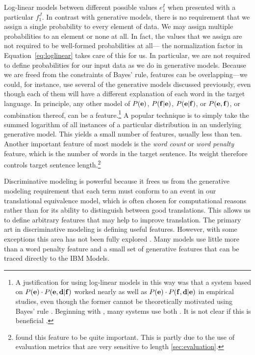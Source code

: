 \noindent Log-linear models 
between different possible values $e_1^I$ when presented
with a particular $f_1^J$.  In contrast
with generative models, there is no requirement that we
assign a single probability to every element of data.  
We may assign multiple probabilities to an element or none
at all.  In fact, the values that we assign are not
required to be well-formed probabilities at all---
the normalization factor in Equation~\ref{eq:loglinear}
takes care of this for us.
In particular, we are not required to define
probabilities for our input data as we do in 
generative models.  Because we are 
freed from the constraints of Bayes' rule, features 
can be overlapping---we could, for instance, use 
several of the generative models discussed previously,
even though each of them will have a different 
explanation of each word in the target language.
In principle, any other model of
$P({\bf e})$, $P({\bf f}|{\bf e})$, $P({\bf e}|{\bf f})$, or $P({\bf e},{\bf f})$, or combination
thereof, can be a feature.\footnote{A 
justification for using log-linear models in this way was that  
a system based on $P({\bf e}) \cdot P({\bf e},{\bf d}|{\bf f})$ worked nearly as well as 
$P({\bf e}) \cdot P({\bf f},{\bf d}|{\bf e})$ in empirical studies, even though the former
cannot be theoretically motivated using Bayes' rule
\citep{Och:1999:emnlp,Och:2002:acl}.  Beginning with \citep{Koehn:2004:amta},
many systems use both \citep{Simard:2005:hlt-emnlp,Marcu:2006:emnlp,Chiang:2007:cl}.
It is not clear if this is beneficial \citep{Lopez:2006:amta}.}  A 
popular technique is to simply take the summed logarithm of
all instances of a particular distribution in an underlying 
generative model.  This yields a small number of features,
usually less than ten.  Another important feature of
most models is the {\em word count} or {\em word penalty}
feature, which is the number of words in the
target sentence.  Its weight therefore controls
target sentence length.\footnote{\citet{Lopez:2006:amta} found this
feature to be quite important.  This is partly due to the use
of evaluation metrics that are very sensitive to length
\textsection\ref{sec:evaluation}.}

Discriminative modeling is powerful because it 
frees us from the generative modeling requirement
that each term must conform to an event in our
translational equivalence model, which is often
chosen for computational reasons rather than for
its ability to distinguish between good 
translations.  This allows
us to define arbitrary features that may help to 
improve translation.  The primary art in 
discriminative modeling is defining useful features.  
However, with some exceptions this area has not
been fully explored
\citep{Och:2003:jhu,Och:2004:naacl,Marcu:2006:emnlp,Liang:2006:acl-coling,Venugopal:2007:hlt-naacl}.
Many models use little more than a word penalty feature and a
small set of generative features that can be traced directly to 
the IBM Models.

